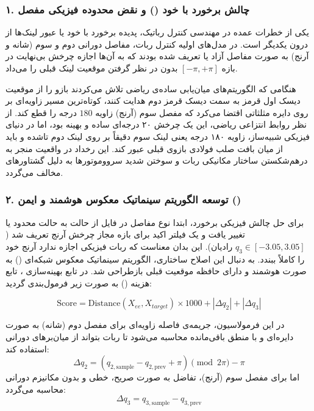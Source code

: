 \documentclass{article}
\begin{document}
\subsubsection*{۱. چالش برخورد با خود () و نقض محدوده فیزیکی مفصل}

یکی از خطرات عمده در مهندسی کنترل رباتیک، پدیده برخورد با خود یا عبور لینک‌ها از درون یکدیگر است. در مدل‌های اولیه کنترل ربات، مفاصل دورانی دوم و سوم (شانه و آرنج) به صورت مفاصل آزاد یا  تعریف شده بودند که به آن‌ها اجازه چرخش بی‌نهایت در بازه $[-\pi, +\pi]$ بدون در نظر گرفتن موقعیت لینک قبلی را می‌داد. 

هنگامی که الگوریتم‌های میان‌یابی ساده‌ی ریاضی تلاش می‌کردند بازو را از موقعیت دیسک اول قرمز به سمت دیسک قرمز دوم هدایت کنند، کوتاه‌ترین مسیر زاویه‌ای بر روی دایره مثلثاتی اقتضا می‌کرد که مفصل سوم (آرنج) زاویه $180$ درجه را قطع کند. از نظر روابط انتزاعی ریاضی، این یک چرخش ۲۰ درجه‌ای ساده و بهینه بود، اما در دنیای فیزیکی شبیه‌ساز، زاویه ۱۸۰ درجه یعنی لینک سوم دقیقاً بر روی لینک دوم تاشده و باید از میان بافت صلب فولادی بازوی قبلی عبور کند. این رخداد در واقعیت منجر به درهم‌شکستن ساختار مکانیکی ربات و سوختن شدید سرووموتورها به دلیل گشتاورهای مخالف می‌گردد.

\subsubsection*{۲. توسعه الگوریتم سینماتیک معکوس هوشمند و ایمن ()}

برای حل چالش فیزیکی برخورد، ابتدا نوع مفاصل در فایل  از حالت  به حالت محدود یا  تغییر یافت و یک فیلتر اکید برای بازه مجاز چرخش آرنج تعریف شد ($q_3 \in [-3.05, 3.05]$ رادیان). این بدان معناست که ربات فیزیکی اجازه ندارد آرنج خود را کاملاً ببندد. به دنبال این اصلاح ساختاری، الگوریتم سینماتیک معکوس شبکه‌ای () به صورت هوشمند و دارای حافظه موقعیت قبلی بازطراحی شد. در تابع بهینه‌سازی ، تابع هزینه () به صورت زیر فرمول‌بندی گردید:

\begin{equation}
	\text{Score} = \text{Distance}(X_{ee}, X_{target}) \times 1000 + |\Delta q_2| + |\Delta q_3|
\end{equation}

در این فرمولاسیون، جریمه‌ی فاصله زاویه‌ای برای مفصل دوم (شانه) به صورت دایره‌ای و با منطق باقی‌مانده محاسبه می‌شود تا ربات بتواند از میان‌برهای دورانی استفاده کند:
\begin{equation}
	\Delta q_2 = (q_{2, \text{sample}} - q_{2, \text{prev}} + \pi) \pmod{2\pi} - \pi
\end{equation}
اما برای مفصل سوم (آرنج)، تفاضل به صورت صریح، خطی و بدون مکانیزم دورانی محاسبه می‌گردد:
\begin{equation}
	\Delta q_3 = q_{3, \text{sample}} - q_{3, \text{prev}}
\end{equation}
\end{document}
